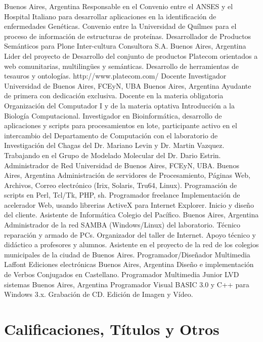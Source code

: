 	{Buenos Aires, Argentina}
	{}
	{Responsable en el Convenio entre el ANSES y el Hospital Italiano para desarrollar
	aplicaciones en la identificación de enfermedades Genéticas. Convenio entre la
	Universidad de Quílmes para el proceso de información de estructuras de proteínas.}
	{Desarrollador de Productos Semánticos para Plone}
	{Inter-cultura Consultora S.A.}
	{Buenos Aires, Argentina}
	{}
	{Lider del proyecto de Desarrollo del conjunto de productos Platecom
	orientados a web comunitarias, multilingües y semánticas. Desarrollo
	de herramientas de tesauros y ontologías. http://www.platecom.com/}
	{Docente Investigador}
	{Universidad de Buenos Aires, FCEyN, UBA}
	{Buenos Aires, Argentina}
	{}
	{Ayudante de primera con dedicación exclusiva.
	Docente en la materia obligatoria Organización del Computador I y de la
	materia optativa Introducción a la Biología Computacional.
	Investigador en Bioinformática, desarrollo de aplicaciones y scripts para
	procesamientos en lote, participante activo en el intercambio del Departamento
	de Computación con el laboratorio de Investigación del Chagas del
	Dr. Mariano Levin y Dr. Martin Vazquez. Trabajando en el Grupo de Modelado Molecular
	del Dr. Dario Estrin.}
	{Administrador de Red}
	{Universidad de Buenos Aires, FCEyN, UBA.}
	{Buenos Aires, Argentina}
	{}
	{Administración de servidores de Procesamiento, Páginas Web,
	Archivos, Correo electrónico (Irix, Solaris, Tru64, Linux).
	Programación de scripts en Perl, Tcl/Tk, PHP, sh.}
	{Programador freelance}
	{}
	{}
	{}
	{Implementación de acelerador Web, usando librerias ActiveX para Internet Explorer. Inicio y diseño del cliente.}
	{Asistente de Informática}
	{Colegio del Pacífico.}
	{Buenos Aires, Argentina}
	{}
	{Administrador de la red SAMBA (Windows/Linux) del
	laboratorio. Técnico reparación y armado de PCs. Organizador del taller de
	Internet. Apoyo técnico y didáctico a profesores y alumnos. Asistente en el
	proyecto de la red de los colegios municipales de la ciudad de Buenos Aires.}
	{Programador/Diseñador Multimedia}
	{Laffont Ediciones electrónicas}
	{Buenos Aires, Argentina}
	{}
	{Diseño e implementación de Verbos Conjugados en Castellano.}
	{Programador Multimedia Junior}
	{LVD sistemas}
	{Buenos Aires, Argentina}
	{}
	{Programador Visual BASIC 3.0 y C++ para Windows 3.x. Grabación de CD. Edición de Imagen y Vídeo.}
\label{profesional:hasta}

\section{Calificaciones, Títulos y Otros}\label{otros:desde}

